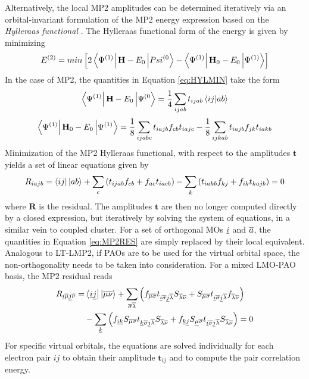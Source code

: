 Alternatively, the local MP2 amplitudes can be determined iteratively via an orbital-invariant formulation of the MP2 energy expression based on the \emph{Hylleraas functional} \cite{Hyl1929,Pul1986}. The  Hylleraas functional form of the energy is given by minimizing 
\begin{equation}
E^{(2)} = min \left[ 2\bra{\Psi^{(1)}} \mathbf{H} - E_0  \ket{Psi^{(0}} - \bra{\Psi^{(1)}} \mathbf{H}_0 - E_0 \ket{\Psi^{(1)}} \right]
\label{eq:HYLMIN}
\end{equation}
\noindent In the case of MP2, the quantities in Equation \ref{eq:HYLMIN} take the form
\begin{equation}
\bra{\Psi^{(1)}} \mathbf{H} - E_0  \ket{\Psi^{(0}} = \frac{1}{4} \sum_{ijab} t_{ijab} \bra{ij}\ket{ab}
\end{equation}
\begin{equation}
\bra{\Psi^{(1)}} \mathbf{H}_0 - E_0 \ket{\Psi^{(1)}} = \frac{1}{8} \sum_{ijabc} t_{iajb} f_{cb} t_{iajc} - \frac{1}{8} \sum_{ijkab} t_{iajb} f_{jk} t_{iakb}
\end{equation}
\noindent Minimization of the MP2 Hylleraas functional, with respect to the amplitudes $\mathbf{t}$ yields a set of linear equations given by
\begin{equation}
\begin{split}
R_{iajb} = \bra{ij} {} \ket{ab} + \sum_c \left(t_{ijab} f_{cb} + f_{ac} t_{iacb} \right) - \sum_k \left( t_{iakb} f_{kj} + f_{ik} t_{kajb} \right) = 0
\end{split}
\label{eq:MP2RES}
\end{equation}
\noindent where $\mathbf{R}$ is the residual. The amplitudes $\mathbf{t}$ are then no longer computed directly by a closed expression, but iteratively by solving the system of equations, in a similar vein to coupled cluster. %
For a set of orthogonal MOs $\underline{i}$ and $\overline{a}$, the quantities in Equation \ref{eq:MP2RES} are simply replaced by their local equivalent. Analogous to LT-LMP2, if PAOs are to be used for the virtual orbital space, the non-orthogonality needs to be taken into consideration. For a mixed LMO-PAO basis, the MP2 residual reads
\begin{equation}
\begin{split}
R_{\underline{i} \overline{\mu} \underline{j} \overline{\nu}} = & \bra{\underline{i}\underline{j}}{}\ket{\overline{\mu}\overline{\nu}} + \sum_{\overline{\sigma}\overline{\lambda}} \left( f_{\overline{\mu}\overline{\sigma}} t_{\underline{i} \overline{\sigma} \underline{j} \overline{\lambda}} S_{\overline{\lambda}\overline{\nu}} + S_{\overline{\mu}\overline{\sigma}} t_{\underline{i} \overline{\sigma} \underline{j} \overline{\lambda}} f_{\overline{\lambda}\overline{\nu}} \right) \\
&-  \sum_{\underline{k}} \left( f_{\underline{i} \underline{k}} S_{\overline{\mu}\overline{\sigma}} t_{\underline{k} \overline{\sigma} \underline{j} \overline{\lambda}} S_{\overline{\lambda} \overline{\nu}} + f_{\underline{k} \underline{j}} S_{\underline{\mu}\overline{\sigma}} t_{\underline{i} \overline{\sigma} \underline{j} \overline{\lambda}} S_{\overline{\lambda}\overline{\nu}} \right) = 0
\end{split} 
\end{equation}
\noindent For specific virtual orbitals, the equations are solved individually for each electron pair $ij$ to obtain their amplitude $\mathbf{t}_{ij}$ and to compute the pair correlation energy. 

